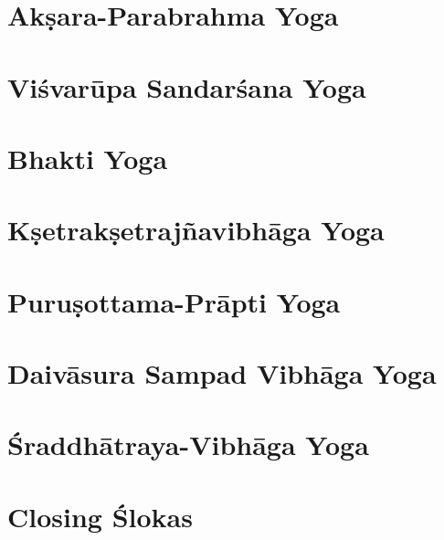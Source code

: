 \documentclass{scrbook}
\begin{document}
\chapter{Akṣara-Parabrahma Yoga}
\begin{multicols}{2}
    
\end{multicols}

\setcounter{chapter}{10}

\chapter{Viśvarūpa Sandarśana Yoga}
\begin{multicols}{2}
    
\end{multicols}

\chapter{Bhakti Yoga}
\begin{multicols}{2}
    
\end{multicols}

\chapter{Kṣetrakṣetrajñavibhāga Yoga}
\begin{multicols}{2}
    
\end{multicols}

\setcounter{chapter}{14}

\chapter{Puruṣottama-Prāpti Yoga}
\begin{multicols}{2}
    
\end{multicols}

\chapter{Daivāsura Sampad Vibhāga Yoga}
\begin{multicols}{2}
    
\end{multicols}

\chapter{Śraddhātraya-Vibhāga Yoga}
\begin{multicols}{2}
    
\end{multicols}

\backmatter
\chapter{Closing Ślokas}

\end{document}
